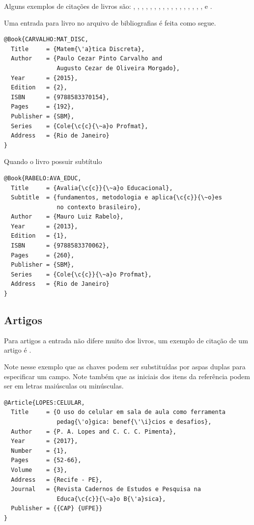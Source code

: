 \documentclass[fleqn]{profmat-cefet}
\begin{document}
Alguns exemplos de citações de livros são:
\citeauthor{MOREIRA:TOP_TEO_NUM}, 
\citeauthor{CARVALHO:MAT_DISC}, 
\citeauthor{GIRALDO:REC_COMP_ENS_MAT}, 
\citeauthor{GOMEZ:GEO_ANA}, 
\citeauthor{HEFEZ:ARIT}, 
\citeauthor{HEFEZ:EX_RES_ARIT}, 
\citeauthor{HEFEZ:EX_RES_ALG_LIN}, 
\citeauthor{HEFEZ:INTRO_ALG_LIN}, 
\citeauthor{HEFEZ:POLY_EQ_ALG}, 
\citeauthor{LAMPORT:LATEX}, 
\citeauthor{LIMA:NUM_FUNC_R}, 
\citeauthor{MORAISFILHO:MAN_REDACAO_MAT}, 
\citeauthor{MUNIZNETO:FUND_CALC}, 
\citeauthor{MUNIZNETO:GEO}, 
\citeauthor{PITOMBEIRA:TOP_HIST_MAT}, 
\citeauthor{RABELO:AVA_EDUC}, 
\citeauthor{ROUSSEAU:MAT_ATU_1}, 
\citeauthor{ROUSSEAU:MAT_ATU_2} e 
\citeauthor{WAGNER:T_PROB_ELEM}.

Uma entrada para livro no arquivo de bibliografias é feita como segue.
\begin{lstlisting}
@Book{CARVALHO:MAT_DISC,
  Title     = {Matem{\'a}tica Discreta},
  Author    = {Paulo Cezar Pinto Carvalho and 
               Augusto Cezar de Oliveira Morgado},
  Year      = {2015},
  Edition   = {2},
  ISBN      = {9788583370154},
  Pages     = {192},
  Publisher = {SBM},
  Series    = {Cole{\c{c}{\~a}o Profmat},
  Address   = {Rio de Janeiro}
}
\end{lstlisting}

Quando o livro possuir subtítulo
\begin{lstlisting}
@Book{RABELO:AVA_EDUC,
  Title     = {Avalia{\c{c}}{\~a}o Educacional},
  Subtitle  = {fundamentos, metodologia e aplica{\c{c}}{\~o}es 
               no contexto brasileiro},
  Author    = {Mauro Luiz Rabelo},
  Year      = {2013},
  Edition   = {1},
  ISBN      = {9788583370062},
  Pages     = {260},
  Publisher = {SBM},
  Series    = {Cole{\c{c}}{\~a}o Profmat},
  Address   = {Rio de Janeiro}
}
\end{lstlisting}

\subsection{Artigos}

Para artigos a entrada não difere muito dos livros, 
um exemplo de citação de um artigo é \citeauthor{LOPES:CELULAR}.

Note nesse exemplo que as chaves podem ser substituídas por aspas duplas para especificar um campo. 
Note também que as iniciais dos itens da referência podem ser em letras maiúsculas ou minúsculas.
\begin{lstlisting}
@Article{LOPES:CELULAR,
  Title     = {O uso do celular em sala de aula como ferramenta 
               pedag{\'o}gica: benef{\'\i}cios e desafios},
  Author    = {P. A. Lopes and C. C. C. Pimenta},
  Year      = {2017},
  Number    = {1},
  Pages     = {52-66},
  Volume    = {3},
  Address   = {Recife - PE},
  Journal   = {Revista Cadernos de Estudos e Pesquisa na 
               Educa{\c{c}}{\~a}o B{\'a}sica},
  Publisher = {{CAP} {UFPE}}
}
\end{lstlisting}
\end{document}

